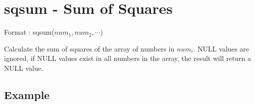 
%

\section{sqsum - Sum of Squares\label{sect:sqsum}}

Format : sqsum($num_1,num_2,\cdots$)

Calculate the sum of squares of the array of numbers in $num_i$. NULL values are ignored, if NULL values exist in all numbers in the array, the result will return a NULL value. 

\subsection*{Example}


%

